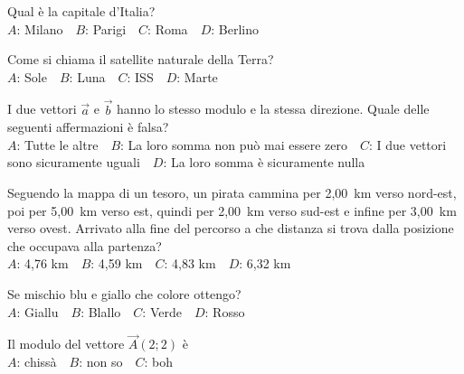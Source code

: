 \def\mcquestionnumber{8}


\mcquestionheader Qual è la capitale d’Italia?\\
{$A$}: Milano\ \ {$B$}: Parigi\ \ {$C$}: Roma\ \ {$D$}: Berlino\ \ 

\mcquestionfooter



\def\mcquestionnumber{9}


\mcquestionheader Come si chiama il satellite naturale della Terra?\\
{$A$}: Sole\ \ {$B$}: Luna\ \ {$C$}: ISS\ \ {$D$}: Marte\ \ 

\mcquestionfooter



\def\mcquestionnumber{10}


\mcquestionheader I due vettori $\vec{a}$ e $\vec{b}$ hanno lo stesso modulo e la stessa direzione. Quale delle seguenti affermazioni è falsa?\\
{$A$}: Tutte le altre\ \ {$B$}: La loro somma non può mai essere zero\ \ {$C$}: I due vettori sono sicuramente uguali\ \ {$D$}: La loro somma è sicuramente nulla\ \ 

\mcquestionfooter



\def\mcquestionnumber{11}


\mcquestionheader Seguendo la mappa di un tesoro, un pirata cammina per 2,00~km verso nord-est, poi per 5,00~km verso est, quindi per 2,00~km verso sud-est e infine per 3,00~km verso ovest. Arrivato alla fine del percorso a che distanza si trova dalla posizione che occupava alla partenza?\\
{$A$}: 4,76 km\ \ {$B$}: 4,59 km\ \ {$C$}: 4,83 km\ \ {$D$}: 6,32 km\ \ 

\mcquestionfooter



\def\mcquestionnumber{12}


\mcquestionheader Se mischio blu e giallo che colore ottengo?\\
{$A$}: Giallu\ \ {$B$}: Blallo\ \ {$C$}: Verde\ \ {$D$}: Rosso\ \ 

\mcquestionfooter



\mcpaperfooter

\def\mcserialnumber{34}
\mcpaperheader


\def\mcquestionnumber{1}


\mcquestionheader Il modulo del vettore $\vec{A}(2;2)$ è\\
{$A$}: chissà\ \ {$B$}: non so\ \ {$C$}: boh\ \ 

